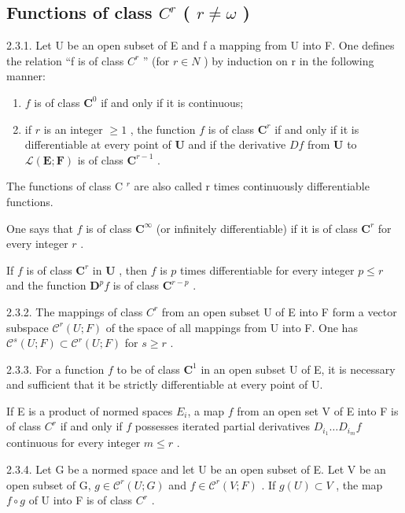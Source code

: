 \subsection{\texorpdfstring{Functions of class \(C^{r}\) ( \(r \neq \omega\) )}{Functions of class C\^{}\{r\} (r ≠ ω)}}

2.3.1. Let U be an open subset of E and f a mapping from U into F. One defines the relation “f is of class \(C^{r}\) ” (for \(r \in N\) ) by induction on r in the following manner:

\begin{enumerate}
\def\labelenumi{\arabic{enumi})}
\item
  \(f\) is of class \(\mathbf{C}^{0}\) if and only if it is continuous;
\item
  if \(r\) is an integer \(\geqslant 1\) , the function \(f\) is of class \(\mathbf{C}^{r}\) if and only if it is differentiable at every point of \(\mathbf{U}\) and if the derivative \(Df\) from \(\mathbf{U}\) to \(\mathcal{L}(\mathbf{E};\mathbf{F})\) is of class \(\mathbf{C}^{r-1}\) .
\end{enumerate}

The functions of class C \(^{r}\) are also called r times continuously differentiable functions.

One says that \(f\) is of class \(\mathbf{C}^{\infty}\) (or infinitely differentiable) if it is of class \(\mathbf{C}^{r}\) for every integer \(r\) .

If \(f\) is of class \(\mathbf{C}^{r}\) in \(\mathbf{U}\) , then \(f\) is \(p\) times differentiable for every integer \(p \leqslant r\) and the function \(\mathbf{D}^{p}f\) is of class \(\mathbf{C}^{r-p}\) .

2.3.2. The mappings of class \(C^{r}\) from an open subset U of E into F form a vector subspace \(\mathcal{C}^{r}(U;F)\) of the space of all mappings from U into F. One has \(\mathcal{C}^{s}(U;F)\subset\mathcal{C}^{r}(U;F)\) for \(s\geqslant r\) .

2.3.3. For a function \(f\) to be of class \(\mathbf{C}^{1}\) in an open subset U of E, it is necessary and sufficient that it be strictly differentiable at every point of U.

If E is a product of normed spaces \(E_{i}\), a map \(f\) from an open set V of E into F is of class \(C^{r}\) if and only if \(f\) possesses iterated partial derivatives \(D_{i_{1}}\ldots D_{i_{m}}f\) continuous for every integer \(m \leqslant r\) .

2.3.4. Let G be a normed space and let U be an open subset of E. Let V be an open subset of G, \(g \in \mathcal{C}^{r}(U; G)\) and \(f \in \mathcal{C}^{r}(V; F)\) . If \(g(U) \subset V\) , the map \(f \circ g\) of U into F is of class \(C^{r}\) .

